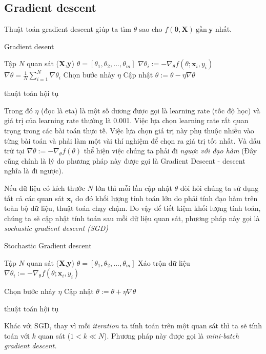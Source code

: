 \subsection{Gradient descent}
Thuật toán gradient descent giúp ta tìm $\theta$ sao cho $f(\mathbf{\theta},\textbf{X})~\text{gần}~\textbf{y}$ nhất.
\begin{algorithm}[H]
\label{alg:grad}
\caption{Gradient desent}
\begin{algorithmic}[1]
\REQUIRE Tập $N$ quan sát (\textbf{X},\textbf{y})
\REQUIRE $\theta=[\theta_1,\theta_2,...,\theta_m]$
\REPEAT 
{}
\STATE $\nabla \theta_i := - \nabla_{\theta}f(\theta;\textbf{x}_i,y_i)$
\ENDFOR
\STATE $\nabla \theta  =\frac{1}{N} \sum^{N}_{i=1}\nabla\theta_i$
\STATE Chọn bước nhảy $\eta$
\STATE Cập nhật $\theta := \theta - \eta\nabla\theta$

\UNTIL	thuật toán hội tụ
\end{algorithmic}
\end{algorithm}
Trong đó $\eta$ (đọc là eta) là một số dương được gọi là learning rate (tốc độ học) và giá trị của learning rate thường là 0.001. Việc lựa chọn learning rate rất quan trọng trong các bài toán thực tế. Việc lựa chọn giá trị này phụ thuộc nhiều vào từng bài toán và phải làm một vài thí nghiệm để chọn ra giá trị tốt nhất. Và dấu trừ tại $\nabla \theta := - \nabla_{\theta}f(\theta)$ thể hiện việc chúng ta phải đi\textit{ ngược với đạo hàm} (Đây cũng chính là lý do phương pháp này được gọi là Gradient Descent - descent nghĩa là đi ngược).\par
Nếu dữ liệu có kích thước $N$ lớn thì mỗi lần cập nhật $\theta$ đòi hỏi chúng ta sử dụng tất cả các quan sát $\textbf{x}_i$ do đó khối lượng tính toán lớn do phải tính đạo hàm trên toàn bộ dữ liệu, thuật toán chạy chậm. Do vậy để tiết kiệm khối lượng tính toán, chúng ta sẽ cập nhật tính toán sau mỗi dữ liệu quan sát, phương pháp này gọi là \textit{sochastic gradient descent (SGD)}

\begin{algorithm}[H]
\label{alg:sgd}
\caption{Stochastic Gradient descent}
\begin{algorithmic}[1]
\REQUIRE Tập $N$ quan sát (\textbf{X},\textbf{y})
\REQUIRE  $\theta=[\theta_1,\theta_2,...,\theta_m]$
\REPEAT 
\STATE Xáo trộn dữ liệu
\STATE $\nabla \theta_i := - \nabla_{\theta}f(\theta;\textbf{x}_i,y_i)$

\STATE Chọn bước nhảy $\eta$
\STATE Cập nhật $\theta := \theta + \eta\nabla\theta$
	\STATE {}
\ENDIF
\ENDFOR

\UNTIL	thuật toán hội tụ
\end{algorithmic}
\end{algorithm}
Khác với SGD, thay vì mỗi \textit{iteration} ta tính toán trên một quan sát thì ta sẽ tính toán với $k$ quan sát ($1<k\ll N$). Phương pháp này được gọi là \textit{mini-batch gradient descent.}

